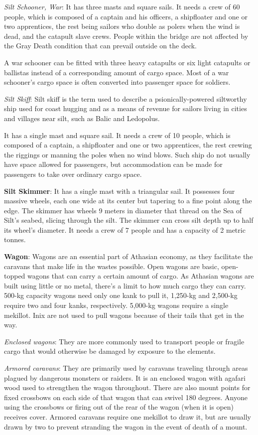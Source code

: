 \textit{Silt Schooner, War}: It has three masts and square sails. It needs a crew of 60 people, which is composed of a captain and his officers, a shipfloater and one or two apprentices, the rest being sailors who double as polers when the wind is dead, and the catapult slave crews. People within the bridge are not affected by the Gray Death condition that can prevail outside on the deck.

A war schooner can be fitted with three heavy catapults or six light catapults or ballistas instead of a corresponding amount of cargo space. Most of a war schooner's cargo space is often converted into passenger space for soldiers.

\textit{Silt Skiff}: Silt skiff is the term used to describe a psionically-powered siltworthy ship used for coast hugging and as a means of revenue for sailors living in cities and villages near silt, such as Balic and Ledopolus.

It has a single mast and square sail. It needs a crew of 10 people, which is composed of a captain, a shipfloater and one or two apprentices, the rest crewing the riggings or manning the poles when no wind blows. Such ship do not usually have space allowed for passengers, but accommodation can be made for passengers to take over ordinary cargo space.

\textbf{Silt Skimmer}: It has a single mast with a triangular sail. It possesses four massive wheels, each one wide at its center but tapering to a fine point along the edge. The skimmer has wheels 9 meters in diameter that thread on the Sea of Silt's seabed, slicing through the silt. The skimmer can cross silt depth up to half its wheel's diameter. It needs a crew of 7 people and has a capacity of 2 metric tonnes.

\textbf{Wagon}: Wagons are an essential part of Athasian economy, as they facilitate the caravans that make life in the wastes possible. Open wagons are basic, open-topped wagons that can carry a certain amount of cargo. As Athasian wagons are built using little or no metal, there's a limit to how much cargo they can carry. 500-kg capacity wagons need only one kank to pull it, 1,250-kg and 2,500-kg require two and four kanks, respectively. 5,000-kg wagons require a single mekillot. Inix are not used to pull wagons because of their tails that get in the way.

\textit{Enclosed wagons}: They are more commonly used to transport people or fragile cargo that would otherwise be damaged by exposure to the elements.

\textit{Armored caravans}: They are primarily used by caravans traveling through areas plagued by dangerous monsters or raiders. It is an enclosed wagon with agafari wood used to strengthen the wagon throughout. There are also mount points for fixed crossbows on each side of that wagon that can swivel 180 degrees. Anyone using the crossbows or firing out of the rear of the wagon (when it is open) receives cover. Armored caravans require one mekillot to draw it, but are usually drawn by two to prevent stranding the wagon in the event of death of a mount.
